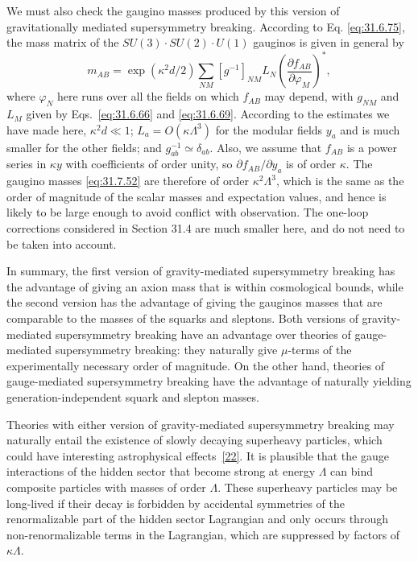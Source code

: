 We must also check the gaugino masses produced by this version of
gravitationally mediated supersymmetry breaking. According to Eq.
\eqref{eq:31.6.75}, the mass matrix of the
\(SU(3)\cdot SU(2)\cdot U(1)\) gauginos is given in general by
\begin{equation}
  m_{AB}
  =\exp(\kappa^2d/2)\sum_{NM}[g^{-1}]_{NM}L_N
    \left(\frac{\partial f_{AB}}{\partial\varphi_M}\right)^*,
  \tag{31.7.52}\label{eq:31.7.52}
\end{equation}
where \(\varphi_N\) here runs over all the fields on which \(f_{AB}\) may
depend, with \(g_{NM}\) and \(L_M\) given by Eqs.~\eqref{eq:31.6.66} and
\eqref{eq:31.6.69}. According to the estimates we have made here,
\(\kappa^2d\ll1\); \(L_a=O(\kappa\Lambda^3)\) for the modular fields \(y_a\)
and is much smaller for the other fields; and \(g_{ab}^{-1}\simeq
\delta_{ab}\). Also, we assume that \(f_{AB}\) is a power series in
\(\kappa y\) with coefficients of order unity, so
\(\partial f_{AB}/\partial y_a\) is of order \(\kappa\). The gaugino masses
\eqref{eq:31.7.52} are therefore of order \(\kappa^2\Lambda^3\), which is
the same as the order of magnitude of the scalar masses and expectation
values, and hence is likely to be large enough to avoid conflict with
observation. The one-loop corrections considered in Section 31.4 are much
smaller here, and do not need to be taken into account.

In summary, the first version of gravity-mediated supersymmetry breaking has
the advantage of giving an axion mass that is within cosmological bounds,
while the second version has the advantage of giving the gauginos masses
that are comparable to the masses of the squarks and sleptons. Both
versions of gravity-mediated supersymmetry breaking have an advantage over
theories of gauge-mediated supersymmetry breaking: they naturally give
\(\mu\)-terms of the experimentally necessary order of magnitude. On the
other hand, theories of gauge-mediated supersymmetry breaking have the
advantage of naturally yielding generation-independent squark and slepton
masses.

Theories with either version of gravity-mediated supersymmetry breaking may
naturally entail the existence of slowly decaying superheavy particles,
which could have interesting astrophysical
effects~\hyperref[ch31-ref-22]{[22]}. It is plausible that the gauge
interactions of the hidden sector that become strong at energy \(\Lambda\)
can bind composite particles with masses of order \(\Lambda\). These
superheavy particles may be long-lived if their decay is forbidden by
accidental symmetries of the renormalizable part of the hidden sector
Lagrangian and only occurs through non-renormalizable terms in the
Lagrangian, which are suppressed by factors of \(\kappa\Lambda\).
